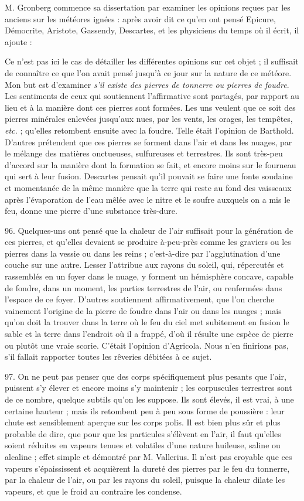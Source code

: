 \documentclass[a4paper, 11pt, oneside, polutonikogreek, french]{article}
\begin{document}
M. Gronberg commence sa dissertation par examiner les opinions reçues par les anciens sur les météores ignées : après avoir dit ce qu'en ont pensé Epicure, Démocrite, Aristote, Gassendy, Descartes, et les physiciens du temps où il écrit, il ajoute :

\og Ce n'est pas ici le cas de détailler les différentes opinions sur cet objet ; il suffisait de connaître ce que l'on avait pensé jusqu'à ce jour sur la nature de ce météore. Mon but est d'examiner \emph{s'il existe des pierres de tonnerre ou pierres de foudre}. Les sentiments de ceux qui soutiennent l'affirmative sont partagés, par rapport au lieu et à la manière dont ces pierres sont formées. Les uns veulent que ce soit des pierres minérales enlevées jusqu'aux nues, par les vents, les orages, les tempêtes, \emph{etc.} ; qu'elles retombent ensuite avec la foudre. Telle était l'opinion de Barthold. D'autres prétendent que ces pierres se forment dans l'air et dans les nuages, par le mélange des matières onctueuses, sulfureuses et terrestres. Ils sont très-peu d'accord sur la manière dont la formation se fait, et encore moins sur le fourneau qui sert à leur fusion. Descartes pensait qu'il pouvait se faire une fonte soudaine et momentanée de la même manière que la terre qui reste au fond des vaisseaux après l'évaporation de l'eau mêlée avec le nitre et le soufre auxquels on a mis le feu, donne une pierre d'une substance très-dure. \fg

96. Quelques-uns ont pensé que la chaleur de l'air suffisait pour la génération de ces pierres, et qu'elles devaient se produire à-peu-près comme les graviers ou les pierres dans la vessie ou dans les reins ; c'est-à-dire par l'agglutination d'une couche sur une autre. Lesser l'attribue aux rayons du soleil, qui, répercutés et rassemblés en un foyer dans le nuage, y forment un hémisphère concave, capable de fondre, dans un moment, les parties terrestres de l'air, ou renfermées dans l'espace de ce foyer. D'autres soutiennent affirmativement, que l'on cherche vainement l'origine de la pierre de foudre dans l'air ou dans les nuages ; mais qu'on doit la trouver dans la terre où le feu du ciel met subitement en fusion le sable et la terre dans l'endroit où il a frappé, d'où il résulte une espèce de pierre ou plutôt une vraie scorie. C'était l'opinion d'Agricola. Nous n'en finirions pas, s'il fallait rapporter toutes les rêveries débitées à ce sujet.

97. On ne peut pas penser que des corps spécifiquement plus pesants que l'air, puissent s'y élever et encore moins s'y maintenir ; les corpuscules terrestres sont de ce nombre, quelque subtils qu'on les suppose. Ils sont élevés, il est vrai, à une certaine hauteur ; mais ils retombent peu à peu sous forme de poussière : leur chute est sensiblement aperçue sur les corps polis. Il est bien plus sûr et plus probable de dire, que pour que les particules s'élèvent en l'air, il faut qu'elles soient réduites en vapeurs tenues et volatiles d'une nature huileuse, saline ou alcaline ; effet simple et démontré par M. Vallerius. Il n'est pas croyable que ces vapeurs s'épaississent et acquièrent la dureté des pierres par le feu du tonnerre, par la chaleur de l'air, ou par les rayons du soleil, puisque la chaleur dilate les vapeurs, et que le froid au contraire les condense.
\end{document}
